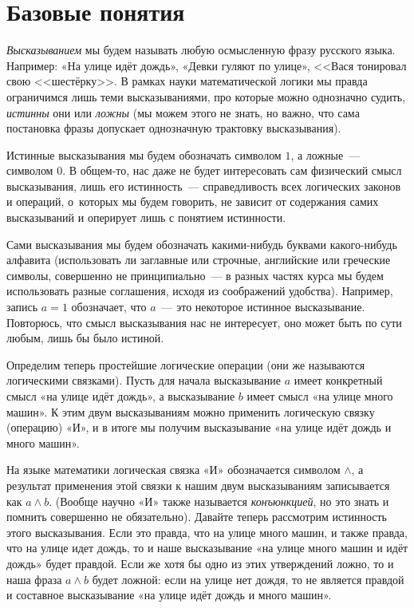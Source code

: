 \section{Базовые понятия}

\textit{Высказыванием} мы будем называть любую осмысленную фразу русского языка. Например: «На улице идёт дождь», «Девки гуляют по улице», <<Вася тонировал свою <<шестёрку>>. В рамках науки математической логики мы правда ограничимся лишь теми высказываниями, про которые можно однозначно судить, \textit{истинны} они или \textit{ложны} (мы можем этого не знать, но важно, что сама постановка фразы допускает однозначную трактовку высказывания).

Истинные высказывания мы будем обозначать символом $1$, а ложные~--- символом $0$. В общем-то, нас даже не будет интересовать сам физический смысл высказывания, лишь его истинность~--- справедливость всех логических законов и операций, о~которых мы будем говорить, не зависит от содержания самих высказываний и оперирует лишь с понятием истинности.

Сами высказывания мы будем обозначать какими-нибудь буквами какого-нибудь алфавита (использовать ли заглавные или строчные, английские или греческие символы, совершенно не принципиально~--- в разных частях курса мы будем использовать разные соглашения, исходя из соображений удобства). Например, запись $a = 1$ обозначает, что $a$~--- это некоторое истинное высказывание. Повторюсь, что смысл высказывания нас не интересует, оно может быть по сути любым, лишь бы было истиной.

Определим теперь простейшие логические операции (они же называются логическими связками). Пусть для начала высказывание $a$ имеет конкретный смысл «на улице идёт дождь», а высказывание $b$ имеет смысл «на улице много машин». К этим двум высказываниям можно применить логическую связку (операцию) «И», и в итоге мы получим высказывание «на улице идёт дождь и много машин».

На языке математики логическая связка «И» обозначается символом $\wedge$, а результат применения этой связки к нашим двум высказываниям записывается как $a\wedge b$. (Вообще научно «И» также называется \textit{конъюнкцией}, но это знать и помнить совершенно не обязательно). Давайте теперь рассмотрим истинность этого высказывания. Если это правда, что на улице много машин, и также правда, что на улице идет дождь, то и наше высказывание «на улице много машин и идёт дождь» будет правдой. Если же хотя бы одно из этих утверждений ложно, то и наша фраза $a \wedge b$ будет ложной: если на улице нет дождя, то не является правдой и составное высказывание «на улице идёт дождь и много машин».

